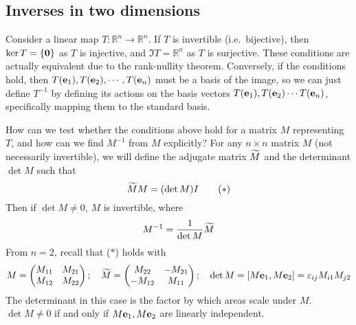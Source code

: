 \subsection{Inverses in two dimensions}
Consider a linear map \(T\colon \mathbb R^n \to \mathbb R^n\).
If \(T\) is invertible (i.e.\ bijective), then \(\ker T = \{ \vb 0 \}\) as \(T\) is injective, and \(\Im T = \mathbb R^n\) as \(T\) is surjective.
These conditions are actually equivalent due to the rank-nullity theorem.
Conversely, if the conditions hold, then \(T(\vb e_1), T(\vb e_2), \cdots, T(\vb e_n)\) must be a basis of the image, so we can just define \(T^{-1}\) by defining its actions on the basis vectors \(T(\vb e_1), T(\vb e_2) \cdots T(\vb e_n)\), specifically mapping them to the standard basis.

How can we test whether the conditions above hold for a matrix \(M\) representing \(T\), and how can we find \(M^{-1}\) from \(M\) explicitly?
For any \(n \times n\) matrix \(M\) (not necessarily invertible), we will define the adjugate matrix \(\widetilde{M}\) and the determinant \(\det M\) such that
\[
	\widetilde{M} M = (\det M) I \tag{\(\ast\)}
\]
Then if \(\det M \neq 0\), \(M\) is invertible, where
\[
	M^{-1} = \frac{1}{\det M}\widetilde{M}
\]
From \(n=2\), recall that (\(\ast\)) holds with
\[
	M = \begin{pmatrix}
		M_{11} & M_{21} \\
		M_{12} & M_{22}
	\end{pmatrix};\quad \widetilde{M} = \begin{pmatrix}
		M_{22}  & -M_{21} \\
		-M_{12} & M_{11}
	\end{pmatrix};\quad \det M = [M\vb e_1, M\vb e_2] = \varepsilon_{ij}M_{i1}M_{j2}
\]
The determinant in this case is the factor by which areas scale under \(M\).
\(\det M \neq 0\) if and only if \(M\vb e_1, M\vb e_2\) are linearly independent.

